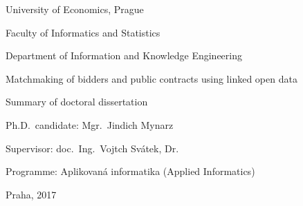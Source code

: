 \begin{titlepage}
    \begin{center}
        \begingroup 
        \sffamily

        \large
        University of Economics, Prague
        
        \small
        Faculty of Informatics and Statistics
        
        Department of Information and Knowledge Engineering

        \vfill

        \LARGE
        Matchmaking of bidders and public contracts using linked open data
        
        \normalsize
        Summary of doctoral dissertation

        \vspace{4cm}
       
        \small
        Ph.D.~candidate: Mgr.~Jind\rhacek{}ich Mynarz

        Supervisor: doc.~Ing.~Vojt\ehacek{}ch Svátek, Dr.

        Programme: Aplikovaná informatika (Applied Informatics)

        \vfill
        
        Praha, 2017

        \endgroup
    \end{center}
\end{titlepage}
